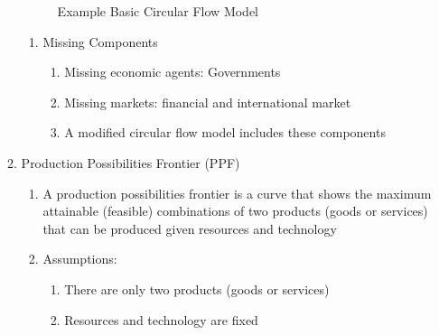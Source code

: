 \documentclass[12pt]{article}
\begin{document}
\begin{enumerate}
\begin{enumerate}
\begin{enumerate}
            \end{enumerate}

            \begin{center}
              \begin{figure}[h]
                \centering
                
                \caption{Example Basic Circular Flow Model}
                \label{fig:1}
              \end{figure}
            \end{center}

            \begin{enumerate}

              \item Missing Components

                \begin{enumerate}

                  \item Missing economic agents: Governments

                  \item Missing markets: financial and international market

                  \item A modified circular flow model includes these components

                \end{enumerate}

            \end{enumerate}

          \item Production Possibilities Frontier (PPF)

            \begin{enumerate}

              \item A production possibilities frontier is a curve that shows the maximum attainable (feasible) combinations of two products (goods or services) that can be produced given resources and technology

              \item Assumptions:

                \begin{enumerate}

                  \item There are only two products (goods or services)

                  \item Resources and technology are fixed


\end{enumerate}
\end{enumerate}
\end{enumerate}
\end{enumerate}
\end{document}
